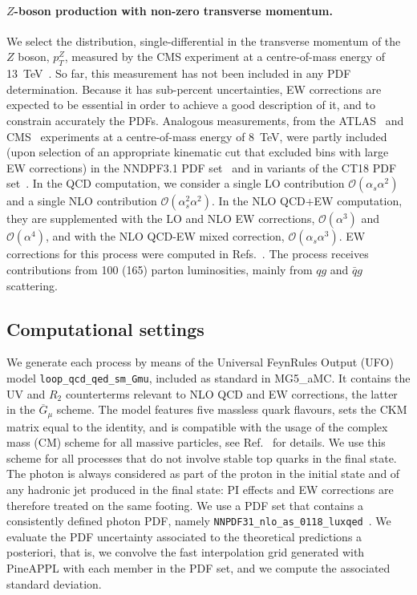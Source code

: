 \paragraph{$Z$-boson production with non-zero transverse momentum.}
We select the distribution, single-differential in the transverse momentum of
the $Z$ boson, $p_T^Z$, measured by the CMS experiment at a centre-of-mass
energy of 13~TeV~\cite{Sirunyan:2019bzr}. So far, this measurement has not been
included in any PDF determination. Because it has sub-percent uncertainties,
EW corrections are expected to be essential in order to achieve a good
description of it, and to constrain accurately the PDFs. Analogous measurements,
from the ATLAS~\cite{Aad:2015auj} and CMS~\cite{Khachatryan:2015oaa}
experiments at a centre-of-mass energy of 8~TeV, were partly included (upon
selection of an appropriate kinematic cut that excluded bins with large EW
corrections) in the NNDPF3.1 PDF set~\cite{Ball:2017nwa} and in variants of
the CT18 PDF set~\cite{Hou:2019efy}. In the QCD computation, we consider a
single LO contribution $\mathcal{O}(\alpha_s\alpha^2)$ and a single NLO
contribution $\mathcal{O}(\alpha_s^2\alpha^2)$. In the NLO QCD+EW computation,
they are supplemented with the LO and NLO EW corrections,
$\mathcal{O}(\alpha^3)$ and $\mathcal{O}(\alpha^4)$, and with the NLO
QCD-EW mixed correction, $\mathcal{O}(\alpha_s\alpha^3)$. EW corrections for
this process were computed in
Refs.~\cite{Kuhn:2005az,Denner:2011vu,Hollik:2015pja,Kallweit:2015dum}.
The process receives contributions from 100 (165) parton luminosities, mainly
from $qg$ and $\bar{q}g$ scattering.

\subsection{Computational settings}
\label{subsec:computational_settings}

We generate each process by means of the Universal FeynRules Output
(UFO)~\cite{Degrande:2011ua} model {\tt loop\_qcd\_qed\_sm\_Gmu},
included as standard in {\sc MG5\_aMC}. It contains the UV and $R_2$
counterterms relevant to NLO QCD and EW corrections, the latter in the
$\overline{G}_\mu$ scheme. The model features five massless quark flavours,
sets the CKM matrix equal to the identity, and is compatible with the usage of
the complex mass (CM) scheme for all massive particles, see
Ref.~\cite{Frederix:2018nkq} for details. We use this scheme
for all processes that do not involve stable top quarks in the final state.
The photon is always considered as part of the proton in the initial state and
of any hadronic jet produced in the final state: PI effects and EW corrections
are therefore treated on the same footing. We use a PDF set that contains a
consistently defined photon PDF, namely
{\tt NNPDF31\_nlo\_as\_0118\_luxqed}~\cite{Bertone:2017bme}. We evaluate the PDF
uncertainty associated to the theoretical predictions a posteriori, that is,
we convolve the fast interpolation grid generated with {\sc PineAPPL} with
each member in the PDF set, and we compute the associated standard deviation.

